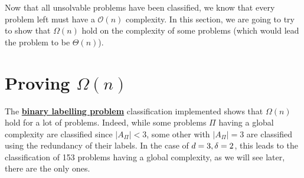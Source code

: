 Now that all unsolvable problems have been classified, we know that every problem left must have a $\mathcal{O}(n)$ complexity. In this section, we are going to try to show that  $\Omega(n)$ hold on the complexity of some problems (which would lead the problem to be $\Theta(n)$).
\section[Proving Omega(n)]{Proving $\Omega(n)$}
The \hyperref[sec:BLP]{\textbf{binary labelling problem}} classification implemented shows that $\Omega(n)$ hold for a lot of problems. Indeed, while some problems $\Pi$ having a global complexity are classified since $|A_\Pi|<3$, some other with $|A_\Pi| = 3$ are classified using the redundancy of their labels. In the case of $d = 3, \delta = 2$, this leads to the classification of 153 problems having a global complexity, as we will see later, there are the only ones.